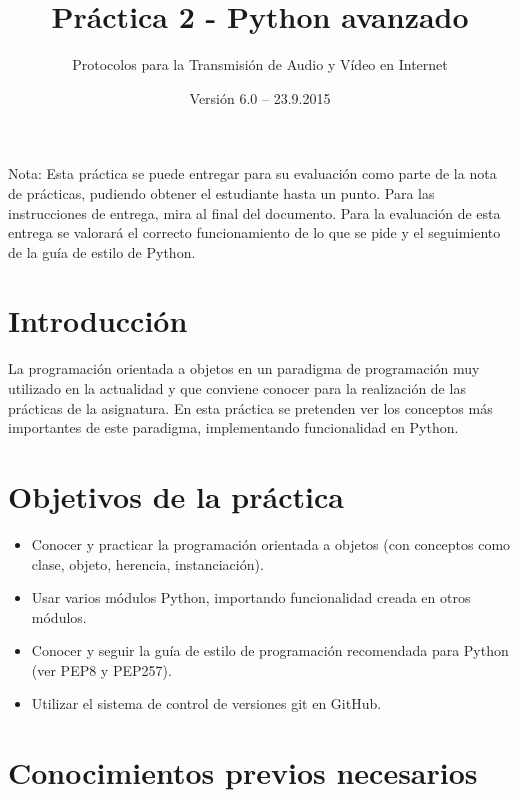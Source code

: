 \documentclass[11pt,a4paper]{article}
\begin{document}
\title{Práctica 2 - Python avanzado}
\author{Protocolos para la Transmisión de Audio y Vídeo en Internet}
\date{Versión 6.0 – 23.9.2015}


\maketitle


Nota: Esta práctica se puede entregar para su evaluación como parte de la nota de prácticas, pudiendo obtener el estudiante hasta un punto. Para las instrucciones de entrega, mira al final del documento. Para la evaluación de esta entrega se valorará el correcto funcionamiento de lo que se pide y el seguimiento de la guía de estilo de Python.

\section{Introducción}

La programación orientada a objetos en un paradigma de programación muy utilizado en la actualidad y que conviene conocer para la realización de las prácticas de la asignatura. En esta práctica se pretenden ver los conceptos más importantes de este paradigma, implementando funcionalidad en Python.


\section{Objetivos de la práctica}

\begin{itemize}
  \item Conocer y practicar la programación orientada a objetos (con conceptos como clase, objeto, herencia, instanciación).
  \item Usar varios módulos Python, importando funcionalidad creada en otros módulos.
  \item Conocer y seguir la guía de estilo de programación recomendada para Python (ver PEP8 y PEP257).
  \item Utilizar el sistema de control de versiones git en GitHub.
\end{itemize}

\section{Conocimientos previos necesarios}
\end{document}

